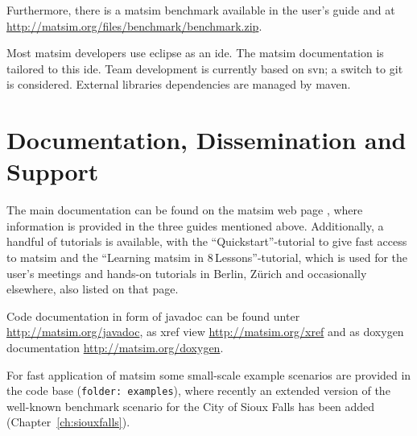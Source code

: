 Furthermore, there is a \gls{matsim} benchmark available in the user's guide and at \url{http://matsim.org/files/benchmark/benchmark.zip}.

Most \gls{matsim} developers use \gls{eclipse} as an \gls{ide}. The \gls{matsim} documentation is tailored to this \gls{ide}. Team development is currently based on \gls{svn}; a switch to \gls{git} is considered. External libraries dependencies are managed by \gls{maven}.

\section{Documentation, Dissemination and Support}
The main documentation can be found on the \gls{matsim} web page \citep[][]{MATSIM-Docu_Webpage_2015}, where information is provided in the three guides mentioned above. Additionally, a handful of tutorials is available, with the ``Quickstart''-tutorial to give fast access to \gls{matsim} and the ``Learning \gls{matsim} in 8\,Lessons''-tutorial, which is used for the user's meetings and hands-on tutorials in Berlin, Zürich and occasionally elsewhere, also listed on that page. 

Code documentation in form of \gls{javadoc} can be found unter \url{http://matsim.org/javadoc}, 
as \gls{xref} view \url{http://matsim.org/xref} and as doxygen documentation \url{http://matsim.org/doxygen}. %

For fast application of \gls{matsim} some small-scale example scenarios are provided in the code base (\lstinline|folder: examples|), where recently an extended version of the well-known benchmark scenario for the City of Sioux Falls has been added \citep[][]{ChakirovFourie_TechRep_FCL_2014} (Chapter~\ref{ch:siouxfalls}). %

